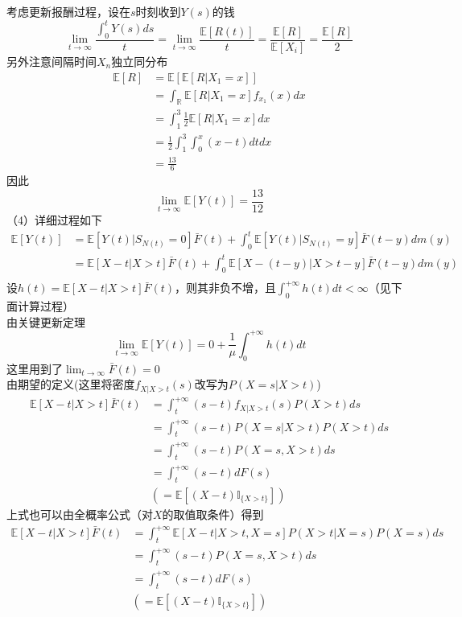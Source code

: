 \documentclass[UTF8]{ctexart}
\begin{document}
考虑更新报酬过程，设在$s$时刻收到$Y(s)$的钱
\[
\lim_{t\rightarrow \infty}\frac{\int_{0}^{t} Y(s)ds}{t}=\lim_{t\rightarrow \infty}\frac{\mathbb{E}\left[R(t) \right] }{t}=\frac{\mathbb{E}\left[ R\right] }{\mathbb{E}[X_i]}=\frac{\mathbb{E}\left[R\right] }{2}
\]
另外注意间隔时间$X_n$独立同分布
$$
\begin{aligned}
	\mathbb{E}[R]&=\mathbb{E}\left[\mathbb{E}\left[R\left| X_1=x\right. \right]  \right] \\
	&=\int_{\mathbb{R}} \mathbb{E}[R|X_1=x]f_{x_1}(x)dx\\
	&=\int_{1}^{3} \frac{1}{2}\mathbb{E}[R|X_1=x]dx\\
	&=\frac{1}{2}\int_{1}^{3} \int_{0}^{x}(x-t)dtdx\\
	&=\frac{13}{6}
\end{aligned}
$$
因此
\[
\lim_{t\to \infty}\mathbb{E}[Y(t)]=\frac{13}{12}
\]
（4）详细过程如下
\begin{align*}
	\mathbb{E}[Y(t)]&=\mathbb{E}\left[ Y(t)|S_{N(t)}=0 \right]\bar{F}(t) +
	\int_{0}^{t} \mathbb{E}\left[ Y(t)|S_{N(t)}=y \right]\bar{F}(t-y)dm(y)\\
	&=\mathbb{E}\left[X-t|X>t \right]\bar{F}(t)+ 	\int_{0}^{t} \mathbb{E}\left[X-(t-y)|X>t-y \right]\bar{F}(t-y)dm(y)\\
\end{align*}
设$h(t)=\mathbb{E}\left[X-t|X>t \right]\bar{F}(t)$，则其非负不增，且$\int_{0}^{+\infty} h(t)dt<\infty$（见下面计算过程）\\
由关键更新定理
\[
\lim_{t\to \infty}\mathbb{E}[Y(t)]=0+\frac{1}{\mu}\int_{0}^{+\infty}h(t)dt
\]
这里用到了$\lim_{t\to \infty}\bar{F}(t)=0$\\
由期望的定义(这里将密度$f_{X|X>t}(s)$改写为$P(X=s|X>t)$)
$$
\begin{aligned}
	\mathbb{E}\left[X-t|X>t \right]\bar{F}(t)&=\int_{t}^{+\infty}(s-t) f_{X|X>t}(s)P(X>t)ds\\
	&=\int_{t}^{+\infty}(s-t) P(X=s|X>t)P(X>t)ds\\
	&=\int_{t}^{+\infty} (s-t)P(X=s,X>t)ds\\
	&=\int_{t}^{+\infty} (s-t)dF(s)\\
	&\left( =\mathbb{E}\left[(X-t) \mathbb{I}_{\{X >t\}}\right]\right)  
\end{aligned}
$$
上式也可以由全概率公式（对$X$的取值取条件）得到
$$
\begin{aligned}
	\mathbb{E}\left[X-t|X>t \right]\bar{F}(t)&=\int_{t}^{+\infty}\mathbb{E}\left[X-t|X>t,X=s \right] P(X>t|X=s)P(X=s)ds\\
	&=\int_{t}^{+\infty} (s-t)P(X=s,X>t)ds\\
	&=\int_{t}^{+\infty} (s-t)dF(s)\\
	&\left( =\mathbb{E}\left[(X-t) \mathbb{I}_{\{X >t\}}\right]\right)  
\end{aligned}
$$
\end{document}
